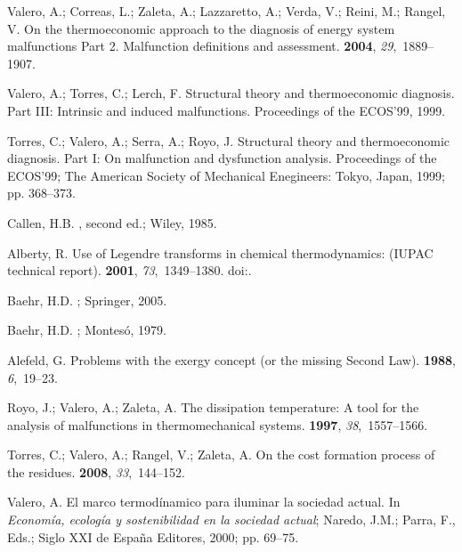 \documentclass[energies,article,submit,moreauthors,pdftex]{Definitions/mdpi}
\begin{document}
\begin{thebibliography}{99}
	Valero, A.; Correas, L.; Zaleta, A.; Lazzaretto, A.; Verda, V.; Reini, M.;
	Rangel, V.
	\newblock On the thermoeconomic approach to the diagnosis of energy system
	malfunctions Part 2. Malfunction definitions and assessment.
	 {\bf 2004}, {\em 29},~1889--1907.
	
	Valero, A.; Torres, C.; Lerch, F.
	\newblock Structural theory and thermoeconomic diagnosis. Part III: Intrinsic and induced malfunctions.
	\newblock  Proceedings of the ECOS'99,  1999.
	
	Torres, C.; Valero, A.; Serra, A.; Royo, J.
	\newblock Structural theory and thermoeconomic diagnosis. Part I: On
	malfunction and dysfunction analysis.
	\newblock  Proceedings of the ECOS'99; The American Society of Mechanical Enegineers: Tokyo, Japan,  1999; pp. 368--373.
	
	Callen, H.B.
	, second ed.; Wiley,  1985.
	
	Alberty, R.
	\newblock Use of Legendre transforms in chemical thermodynamics: (IUPAC technical report).
	 {\bf 2001}, {\em 73},~1349--1380.
	\newblock
	doi:{\href{https://doi.org/10.1351/pac200173081349}{}}.
	
	Baehr, H.D.
	; Springer, 2005.
	
	Baehr, H.D.
	; Montesó,  1979.
	
	Alefeld, G.
	\newblock Problems with the exergy concept (or the missing {S}econd {L}aw).
	 {\bf 1988}, {\em 6},~19--23.
	
	Royo, J.; Valero, A.; Zaleta, A.
	\newblock The dissipation temperature: A tool for the analysis of malfunctions in thermomechanical systems.
	 {\bf 1997}, {\em
    38},~1557--1566.
    
    Torres, C.; Valero, A.; Rangel, V.; Zaleta, A.
    \newblock On the cost formation process of the residues.
     {\bf 2008}, {\em 33},~144--152.
	
	Valero, A.
	\newblock El marco termodínamico para iluminar la sociedad actual. In {\em
		Economía, ecología y sostenibilidad en la sociedad actual}; Naredo, J.M.; Parra, F., Eds.; Siglo XXI de España Editores,  2000; pp. 69--75.	
\end{thebibliography}
\end{document}
